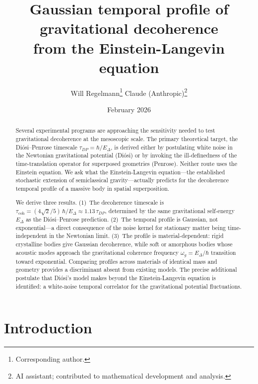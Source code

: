 \documentclass[12pt,a4paper]{article}
\title{\textbf{Gaussian temporal profile of gravitational decoherence\\[6pt]
from the Einstein-Langevin equation}}
\author{Will Regelmann\thanks{Corresponding author.} \quad Claude (Anthropic)\thanks{AI
assistant; contributed to mathematical development and analysis.}}
\date{February 2026}
\begin{document}
\maketitle

\begin{abstract}
Several experimental programs are approaching the sensitivity needed to test gravitational
decoherence at the mesoscopic scale. The primary theoretical target, the
Di\'osi--Penrose timescale $\tau_{DP} = \hbar/E_\Delta$, is derived either by postulating
white noise in the Newtonian gravitational potential (Di\'osi) or by invoking the
ill-definedness of the time-translation operator for superposed geometries (Penrose).
Neither route uses the Einstein equation. We ask what the Einstein-Langevin
equation---the established stochastic extension of semiclassical gravity---actually
predicts for the decoherence temporal profile of a massive body in spatial superposition.

We derive three results. (1)~The decoherence timescale is $\tau_{\text{coh}} =
(4\sqrt{2}/5)\,\hbar/E_\Delta \approx 1.13\,\tau_{DP}$, determined by the same
gravitational self-energy $E_\Delta$ as the Di\'osi--Penrose prediction. (2)~The temporal
profile is Gaussian, not exponential---a direct consequence of the noise kernel for
stationary matter being time-independent in the Newtonian limit. (3)~The profile is
material-dependent: rigid crystalline bodies give Gaussian decoherence, while soft or
amorphous bodies whose acoustic modes approach the gravitational coherence frequency
$\omega_g = E_\Delta/\hbar$ transition toward exponential. Comparing profiles across
materials of identical mass and geometry provides a discriminant absent from existing
models. The precise additional postulate that Di\'osi's model makes beyond the
Einstein-Langevin equation is identified: a white-noise temporal correlator for the
gravitational potential fluctuations.
\end{abstract}

\section{Introduction}
\end{document}
